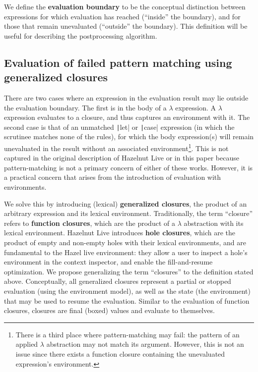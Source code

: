 We define the \textbf{evaluation boundary} to be the conceptual distinction between expressions for which evaluation has reached (``inside'' the boundary), and for those that remain unevaluated (``outside'' the boundary). This definition will be useful for describing the postprocessing algorithm.

\subsection{Evaluation of failed pattern matching using generalized closures}
\label{sec:failed_pattern_match}

There are two cases where an expression in the evaluation result may lie outside the evaluation boundary. The first is in the body of a $\lambda$ expression. A $\lambda$ expression evaluates to a closure, and thus captures an environment with it. The second case is that of an unmatched \texttt|let| or \texttt|case| expression (in which the scrutinee matches none of the rules), for which the body expression(s) will remain unevaluated in the result without an associated environment\footnote{There is a third place where pattern-matching may fail: the pattern of an applied $\lambda$ abstraction may not match its argument. However, this is not an issue since there exists a function closure containing the unevaluated expression's environment.}. This is not captured in the original description of Hazelnut Live \cite{conf/popl/HazelnutLive19} or in this paper because pattern-matching is not a primary concern of either of these works. However, it is a practical concern that arises from the introduction of evaluation with environments.

We solve this by introducing (lexical) \textbf{generalized closures}, the product of an arbitrary expression and its lexical environment. Traditionally, the term ``closure'' refers to \textbf{function closures}, which are the product of a $\lambda$ abstraction with its lexical environment. Hazelnut Live \cite{conf/popl/HazelnutLive19} introduces \textbf{hole closures}, which are the product of empty and non-empty holes with their lexical environments, and are fundamental to the Hazel live environment: they allow a user to inspect a hole's environment in the context inspector, and enable the fill-and-resume optimization. We propose generalizing the term ``closures'' to the definition stated above. Conceptually, all generalized closures represent a partial or stopped evaluation (using the environment model), as well as the state (the environment) that may be used to resume the evaluation. Similar to the evaluation of function closures, closures are final (boxed) values and evaluate to themselves.

